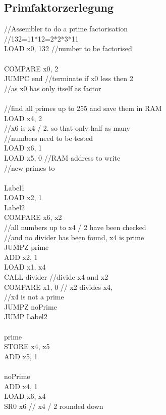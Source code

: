 \documentclass{scrartcl}
\begin{document}
\subsection{Primfaktorzerlegung}
\begin{multicols*}{2}
//Assembler to do a prime factorisation\\
//132=11*12=2*2*3*11\\
LOAD x0, 132 //number to be factorised\\
\\
COMPARE x0, 2\\
JUMPC end //terminate if x0 less then 2\\
//as x0 has only itself as factor\\
\\
//find all primes up to 255 and save them in RAM\\
LOAD x4, 2\\
//x6 is x4 / 2. so that only half as many\\
//numbers need to be tested\\
LOAD x6, 1\\
LOAD x5, 0 //RAM address to write\\
//new primes to\\
\\
Label1\\
LOAD x2, 1\\
Label2\\
COMPARE x6, x2\\
//all numbers up to x4 / 2 have been checked\\
//and no divider has been found, x4 is prime\\
JUMPZ prime\\
ADD x2, 1 \\
LOAD x1, x4\\
CALL divider //divide x4 and x2\\
COMPARE x1, 0 // x2 divides x4,\\
//x4 is not a prime\\
JUMPZ noPrime\\
JUMP Label2\\
\\
prime\\
STORE x4, x5\\
ADD x5, 1\\
\\
noPrime\\
ADD x4, 1\\
LOAD x6, x4\\
SR0 x6 // x4 / 2 rounded down\\

\end{multicols*}
\end{document}
